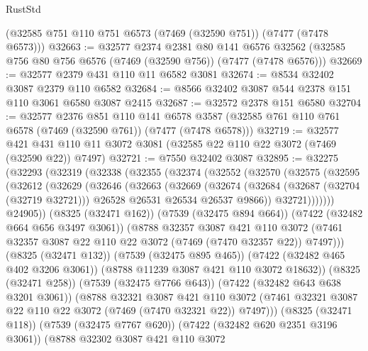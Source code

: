 \begin{lexlean}{RustStd}
\begin{coremodule}
    (@32585 @751 @110 @751 @6573 (@7469 (@32590 @751)) (@7477 (@7478 @6573)))
@32663 := @32577
    @2374
    @2381
    @80
    @141
    @6576
    @32562
    (@32585 @756 @80 @756 @6576 (@7469 (@32590 @756)) (@7477 (@7478 @6576)))
@32669 := @32577 @2379 @431 @110 @11 @6582 @3081
@32674 := @8534 @32402 @3087 @2379 @110 @6582
@32684 := @8566 @32402 @3087 @544 @2378 @151 @110 @3061 @6580 @3087 @2415
@32687 := @32572 @2378 @151 @6580
@32704 := @32577
    @2376
    @851
    @110
    @141
    @6578
    @3587
    (@32585 @761 @110 @761 @6578 (@7469 (@32590 @761)) (@7477 (@7478 @6578)))
@32719 := @32577
    @421
    @431
    @110
    @11
    @3072
    @3081
    (@32585 @22 @110 @22 @3072 (@7469 (@32590 @22)) @7497)
@32721 := @7550 @32402 @3087
@32895 := @32275
    (@32293
      (@32319
        (@32338
          (@32355
            (@32374
              (@32552
                (@32570
                  (@32575
                    (@32595
                      (@32612
                        (@32629
                          (@32646
                            (@32663
                              (@32669
                                (@32674
                                  (@32684
                                    (@32687 (@32704 (@32719 @32721)))
                                    @26528
                                    @26531
                                    @26534
                                    @26537
                                    @9866))
                                @32721)))))))
                  @24905))
              (@8325 (@32471 @162))
              (@7539 (@32475 @894 @664))
              (@7422 (@32482 @664 @656 @3497 @3061))
              (@8788
                @32357
                @3087
                @421
                @110
                @3072
                (@7461 @32357 @3087 @22 @110 @22 @3072 (@7469 (@7470 @32357 @22)) @7497)))
            (@8325 (@32471 @132))
            (@7539 (@32475 @895 @465))
            (@7422 (@32482 @465 @402 @3206 @3061))
            (@8788 @11239 @3087 @421 @110 @3072 @18632))
          (@8325 (@32471 @258))
          (@7539 (@32475 @7766 @643))
          (@7422 (@32482 @643 @638 @3201 @3061))
          (@8788
            @32321
            @3087
            @421
            @110
            @3072
            (@7461 @32321 @3087 @22 @110 @22 @3072 (@7469 (@7470 @32321 @22)) @7497)))
        (@8325 (@32471 @118))
        (@7539 (@32475 @7767 @620))
        (@7422 (@32482 @620 @2351 @3196 @3061))
        (@8788
          @32302
          @3087
          @421
          @110
          @3072

\end{coremodule}
\end{lexlean}
